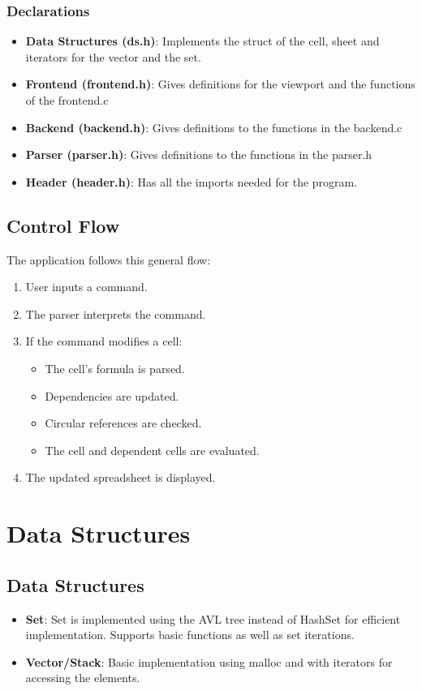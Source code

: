 \documentclass{article}
\begin{document}
\subsubsection{Declarations}
\begin{itemize}
   \item \textbf{Data Structures (ds.h)}: Implements the struct of the cell, sheet and iterators for the vector and the set.
    \item \textbf{Frontend (frontend.h)}: Gives definitions for the viewport and the functions of the frontend.c
    \item \textbf{Backend (backend.h)}: Gives definitions to the functions in the backend.c
    \item \textbf{Parser (parser.h)}: Gives definitions to the functions in the parser.h
    \item \textbf{Header (header.h)}: Has all the imports needed for the program.
\end{itemize}
\subsection{Control Flow}
The application follows this general flow:
\begin{enumerate}
    \item User inputs a command.
    \item The parser interprets the command.
    \item If the command modifies a cell:
    \begin{itemize}
        \item The cell's formula is parsed.
        \item Dependencies are updated.
        \item Circular references are checked.
        \item The cell and dependent cells are evaluated.
    \end{itemize}
    \item The updated spreadsheet is displayed.
\end{enumerate}

\section{Data Structures}
\subsection{Data Structures}
\begin{itemize}
    \item \textbf{Set}: Set is implemented using the AVL tree instead of HashSet for efficient implementation. Supports basic functions as well as set iterations.
    \item \textbf{Vector/Stack}: Basic implementation using malloc and with iterators for accessing the elements.
\end{itemize}
\end{document}
